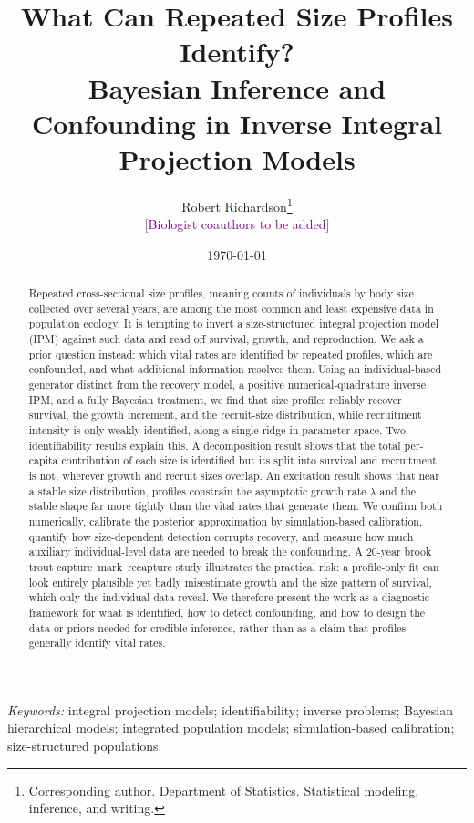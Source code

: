 \documentclass[11pt]{article}
\title{What Can Repeated Size Profiles Identify?\\
Bayesian Inference and Confounding in Inverse Integral Projection Models}
\author{%
  Robert Richardson\thanks{Corresponding author. Department of Statistics.
  Statistical modeling, inference, and writing.}\\
  \textcolor{purple}{[Biologist coauthors to be added]}}
\date{\today}
\begin{document}
\maketitle

\begin{abstract}
\noindent
Repeated cross-sectional size profiles, meaning counts of individuals by body
size collected over several years, are among the most common and least expensive
data in population ecology. It is tempting to invert a size-structured integral
projection model (IPM) against such data and read off survival, growth, and
reproduction. We ask a prior question instead: which vital rates are identified
by repeated profiles, which are confounded, and what additional information
resolves them. Using an individual-based generator distinct from the recovery
model, a positive numerical-quadrature inverse IPM, and a fully Bayesian
treatment, we find that size profiles reliably recover survival, the growth
increment, and the recruit-size distribution, while recruitment intensity is only
weakly identified, along a single ridge in parameter space. Two identifiability
results explain this. A decomposition result shows that the total per-capita
contribution of each size is identified but its split into survival and
recruitment is not, wherever growth and recruit sizes overlap. An excitation
result shows that near a stable size distribution, profiles constrain the
asymptotic growth rate $\lambda$ and the stable shape far more tightly than the
vital rates that generate them. We confirm both numerically, calibrate the
posterior approximation by simulation-based calibration, quantify how
size-dependent detection corrupts recovery, and measure how much auxiliary
individual-level data are needed to break the confounding. A 20-year brook trout
capture--mark--recapture study illustrates the practical risk: a profile-only fit
can look entirely plausible yet badly misestimate growth and the size pattern of
survival, which only the individual data reveal. We therefore present the work as
a diagnostic framework for what is identified, how to detect confounding, and how
to design the data or priors needed for credible inference, rather than as a
claim that profiles generally identify vital rates.
\end{abstract}

\noindent\textit{Keywords:} integral projection models; identifiability;
inverse problems; Bayesian hierarchical models; integrated population models;
simulation-based calibration; size-structured populations.
\end{document}
